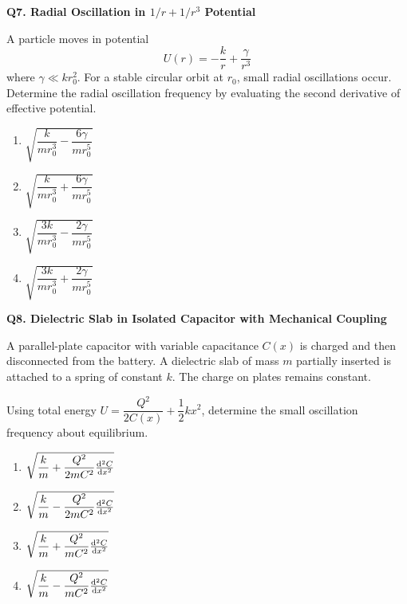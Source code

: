 \documentclass[12pt]{article}
\begin{document}
\textbf{Q7. Radial Oscillation in $1/r + 1/r^3$ Potential}

A particle moves in potential
\[
U(r)= -\frac{k}{r} + \frac{\gamma}{r^3}
\]
where $\gamma \ll kr_0^2$. For a stable circular orbit at $r_0$, small radial oscillations occur. Determine the radial oscillation frequency by evaluating the second derivative of effective potential.

\begin{enumerate}
\item[(A)] $\sqrt{\dfrac{k}{mr_0^3} - \dfrac{6\gamma}{mr_0^5}}$
\item[(B)] $\sqrt{\dfrac{k}{mr_0^3} + \dfrac{6\gamma}{mr_0^5}}$
\item[(C)] $\sqrt{\dfrac{3k}{mr_0^3} - \dfrac{2\gamma}{mr_0^5}}$
\item[(D)] $\sqrt{\dfrac{3k}{mr_0^3} + \dfrac{2\gamma}{mr_0^5}}$
\end{enumerate}

\textbf{Q8. Dielectric Slab in Isolated Capacitor with Mechanical Coupling}


A parallel-plate capacitor with variable capacitance $C(x)$ is charged and then disconnected from the battery. A dielectric slab of mass $m$ partially inserted is attached to a spring of constant $k$. The charge on plates remains constant.

Using total energy $U = \dfrac{Q^2}{2C(x)} + \dfrac12 kx^2$, determine the small oscillation frequency about equilibrium.

\begin{center}
\end{center}

\begin{enumerate}
\item[(A)] $\sqrt{\dfrac{k}{m} + \dfrac{Q^2}{2mC^2}\dv[2]{C}{x}}$
\item[(B)] $\sqrt{\dfrac{k}{m} - \dfrac{Q^2}{2mC^2}\dv[2]{C}{x}}$
\item[(C)] $\sqrt{\dfrac{k}{m} + \dfrac{Q^2}{mC^2}\dv[2]{C}{x}}$
\item[(D)] $\sqrt{\dfrac{k}{m} - \dfrac{Q^2}{mC^2}\dv[2]{C}{x}}$
\end{enumerate}
\end{document}
